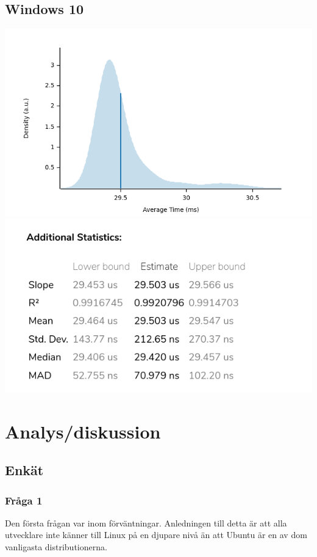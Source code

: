 \documentclass[12pt, a4paper]{report}
\begin{document}
   \subsection{Windows 10}
   \includegraphics[width=1\textwidth]{bench_windows_average_time}
   \includegraphics[width=1\textwidth]{add_stats_windows}


\section{Analys/diskussion}

\subsection{Enkät}

\subsubsection{Fråga 1}
Den första frågan var inom förväntningar. Anledningen till detta är att alla utvecklare inte känner till Linux på en djupare nivå än att Ubuntu är en av dom vanligasta distributionerna\cite{commondistro}.
\end{document}
